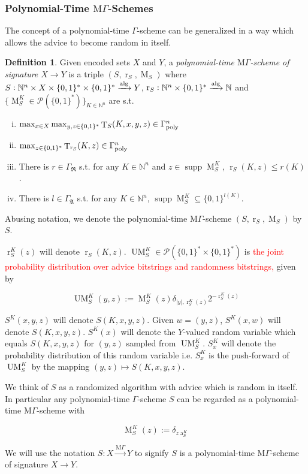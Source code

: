 \documentclass[11pt]{article}
\numberwithin{equation}{section}
\theoremstyle{definition}
\newtheorem{definition}{Definition}[section]
\theoremstyle{plain}
\newcommand{\Bool}{\{0,1\}}
\newcommand{\Words}{{\Bool^*}}
\newcommand{\WordsLen}[1]{{\Bool^{#1}}}
\DeclareMathOperator{\Supp}{supp}
\DeclareMathOperator{\T}{T}
\DeclareMathOperator{\R}{r}
\DeclareMathOperator{\A}{a}
\DeclareMathOperator{\M}{M}
\DeclareMathOperator{\UM}{UM}
\newcommand{\Nats}{\mathbb{N}}
\newcommand{\Abs}[1]{\lvert #1 \rvert}
\newcommand{\GrowR}{\Gamma_{\mathfrak{R}}}
\newcommand{\GrowA}{\Gamma_{\mathfrak{A}}}
\newcommand{\MGrow}{\mathrm{M}\Gamma}
\newcommand{\GammaPoly}{\Gamma_{\textnormal{poly}}}
\newcommand{\Alg}{\xrightarrow{\textnormal{alg}}}
\newcommand{\MScheme}{\xrightarrow{\MGrow}}
\begin{document}
\subsubsection{Polynomial-Time \texorpdfstring{$\MGrow$}{MΓ}-Schemes}

The concept of a polynomial-time $\Gamma$-scheme can be generalized in a way which allows the advice to become random in itself.

\begin{samepage}
\begin{definition}

Given encoded sets $X$ and $Y$, a \emph{polynomial-time $\MGrow$-scheme of signature ${X \rightarrow Y}$} is a triple $(S,\R_S,\M_S)$ where $S: \Nats^n \times X \times \Words \times \Words \Alg Y$, ${\R_S: \Nats^n \times \Words \Alg \Nats}$ and\\ ${\{\M_S^K \in \mathcal{P}(\Words)\}_{K \in \Nats^n}}$ are s.t.

\begin{enumerate}[(i)]

\item $\max_{x \in X} \max_{y,z \in \Words} \T_S(K,x,y,z) \in \GammaPoly^n$

\item ${\max_{z \in \Words} \T_{\R_S}(K,z) \in \GammaPoly^n}$

\item There is $r \in \GrowR$ s.t. for any $K \in \Nats^n$ and $z \in \Supp \M_S^K$, $\R_S(K,z) \leq r(K)$.

\item There is $l \in \GrowA$ s.t. for any $K \in \Nats^n$, $\Supp \M_S^K \subseteq \WordsLen{l(K)}$.

\end{enumerate}

Abusing notation, we denote the polynomial-time $\MGrow$-scheme $(S,\R_S,\M_S)$ by $S$.

$\R_S^K(z)$ will denote $\R_S(K,z)$. $\UM_S^K \in \mathcal{P}(\Words \times \Words)$ is \textcolor{red}{the joint probability distribution over advice bitstrings and randomness bitstrings,} given by 

\[\UM_S^K(y,z):= \M_S^K(z) \delta_{\Abs{y},\R_S^K(z)} 2^{-\R_S^K(z)}\]

$S^K(x,y,z)$ will denote $S(K,x,y,z)$. Given $w=(y,z)$, $S^K(x,w)$ will denote $S(K,x,y,z)$. $S^K(x)$ will denote the $Y$-valued random variable which equals $S(K,x,y,z)$ for $(y,z)$ sampled from $\UM_S^K$. $S_x^K$ will denote the probability distribution of this random variable i.e. $S_x^K$ is the push-forward of $\UM_S^K$ by the mapping $(y,z) \mapsto S(K,x,y,z)$.

We think of $S$ as a randomized algorithm with advice which is random in itself. In particular any polynomial-time $\Gamma$-scheme $S$ can be regarded as a polynomial-time $\MGrow$-scheme with

\[\M_S^K(z):=\delta_{z\A_S^K}\]

We will use the notation $S: X \MScheme Y$ to signify $S$ is a polynomial-time $\MGrow$-scheme of signature $X \rightarrow Y$.

\end{definition}
\end{samepage}
\end{document}

